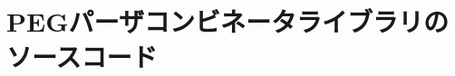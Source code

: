\documentclass{ipsjprosym}
\begin{document}





\onecolumn

\appendix

\section{PEGパーザコンビネータライブラリのソースコード}
\label{sec:peg-source}
\end{document}
